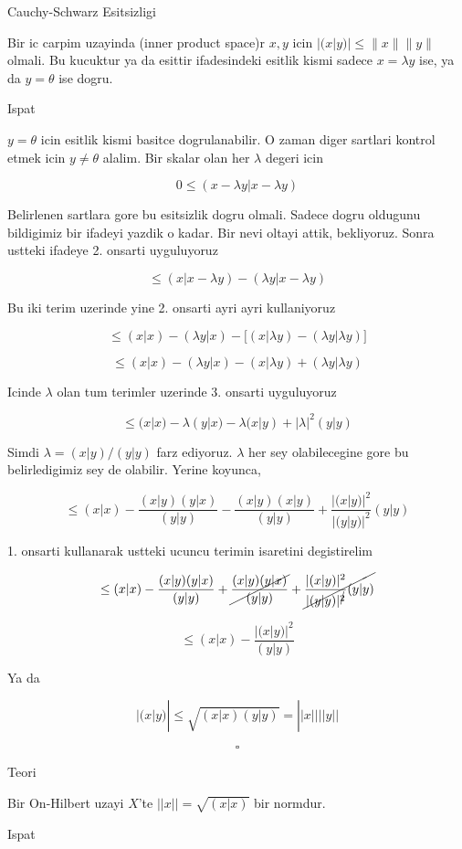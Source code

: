 \documentclass[12pt,fleqn]{article}\usepackage{../common}
\begin{document}
Cauchy-Schwarz Esitsizligi

Bir ic carpim uzayinda (inner product space)r $x,y$ icin $|(x|y)| \le
\|x\|\|y\|$ olmali. 
Bu kucuktur ya da esittir ifadesindeki esitlik kismi sadece $x = \lambda y$
ise, ya da $y = \theta$ ise dogru. 

Ispat

$y = \theta$ icin esitlik kismi basitce dogrulanabilir. O zaman diger
sartlari kontrol etmek icin $y \ne \theta$ alalim. Bir skalar olan her
$\lambda$ degeri icin 

\[ 
0 \le (x-\lambda y | x-\lambda y) 
 \]

Belirlenen sartlara gore bu esitsizlik dogru olmali. Sadece dogru oldugunu
bildigimiz bir ifadeyi yazdik o kadar. Bir nevi oltayi attik, bekliyoruz. 
Sonra ustteki ifadeye 2. onsarti uyguluyoruz

\[ \le (x|x-\lambda y) - (\lambda y| x - \lambda y)\]

Bu iki terim uzerinde yine 2. onsarti ayri ayri kullaniyoruz

\[ 
\le (x|x) - (\lambda y|x) - 
\bigg[ (x|\lambda y) - (\lambda y|\lambda y) \bigg] 
\]

\[ 
\le (x|x) - (\lambda y|x) -  (x|\lambda y) + (\lambda y|\lambda y) 
\]

Icinde $\lambda$ olan tum terimler uzerinde 3. onsarti uyguluyoruz

\[ 
\le
(x|x) - \lambda(y|x) -
\lambda(x|y) + |\lambda|^2 (y|y)
 \]

Simdi $\lambda  = (x|y)/(y|y)$ farz ediyoruz. $\lambda$ her sey olabilecegine gore bu 
belirledigimiz sey de olabilir. Yerine koyunca, 

\[ \le (x|x) - 
\frac{ (x|y)(y|x)}{(y|y)} - 
\frac{ (x|y)(x|y)}{(y|y)} + 
\frac{ |(x|y)|^2}{|(y|y)|^2}(y|y)
 \]

1. onsarti kullanarak ustteki ucuncu terimin isaretini degistirelim

\[ \le (x|x) - 
\frac{ (x|y)(y|x)}{(y|y)} +
\cancel{\frac{ (x|y)(y|x)}{(y|y)}} + 
\cancel{\frac{ |(x|y)|^2}{|(y|y)|^{\cancel{2}}}(y|y)}
 \]

\[ \le (x|x) - 
\frac{ |(x|y)|^2}{(y|y)}
 \]

Ya da 

\[ |(x|y)|  \le \sqrt{ (x|x)(y|y)} = ||x||||y||\]

\[ \square \]

Teori 

Bir On-Hilbert uzayi $X$'te $||x|| = \sqrt{ (x|x)}$ bir normdur. 

Ispat
\end{document}
